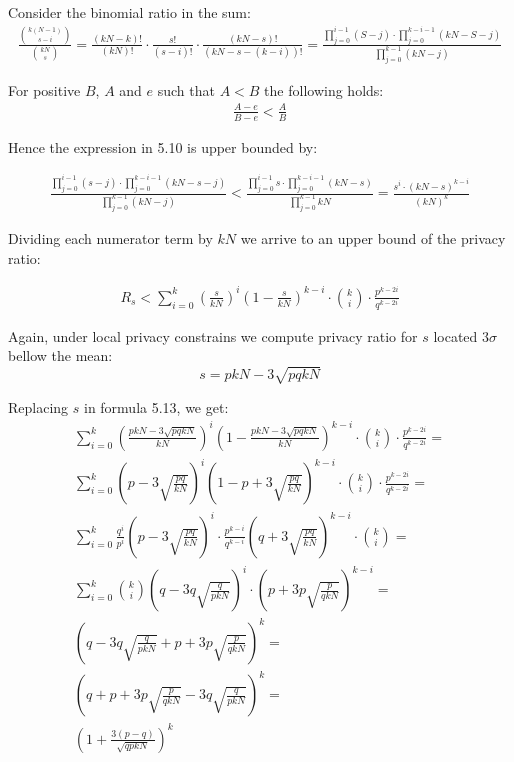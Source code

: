 \documentclass[11pt,draft]{article}
\begin{document}
Consider the binomial ratio in the sum:
\begin{align}
\frac{\binom{k(N-1)}{s - i} }{  \binom{kN}{s} } = \frac{(kN-k)!}{(kN)!}  \cdot \frac{s!}{(s-i)!}  \cdot \frac{(kN -s)!}{(kN - s - (k-i))!} = \frac{ \prod_{j=0}^{i-1} (S-j) \cdot \prod_{j=0}^{k-i-1} (kN - S-j) }{  \prod_{j=0}^{k-1} (kN -j) }
\end{align}

For positive $B$,  $A$ and $e$ such that $A < B$ the following holds:  
\begin{align}
\frac{A-e}{B-e} < \frac{A}{B}
\end{align}

Hence the expression in 5.10 is upper bounded by:

\begin{align}
\frac{ \prod_{j=0}^{i-1} (s-j) \cdot \prod_{j=0}^{k-i-1} (kN - s-j) }{  \prod_{j=0}^{k-1} (kN -j) }  < \frac{ \prod_{j=0}^{i-1} s \cdot \prod_{j=0}^{k-i-1} (kN - s)}{  \prod_{j=0}^{k-1} kN } = \frac{s^i \cdot (kN - s)^{k-i} } { (kN)^k }
\end{align}

Dividing each numerator term by $kN$ we arrive to an upper bound of the privacy ratio:

\begin{align}
R_s < \sum_{i=0}^{k}  \left ( \frac{s}{kN} \right )^i \left ( 1 - \frac{s}{kN} \right )^{k-i} \cdot \binom{k}{i}  \cdot \frac{p^{k-2i}} {q^{k-2i}}
\end{align}

Again, under local privacy constrains we compute privacy ratio for $s$ located $3 \sigma$ bellow the mean:
\[ s = pkN - 3 \sqrt{pqkN} \]

Replacing $s$ in formula 5.13, we get:
\begin{align}
\sum_{i=0}^{k}  \left ( \frac{pkN - 3 \sqrt{pqkN} }{kN} \right )^i \left ( 1 - \frac{pkN - 3 \sqrt{pqkN} }{kN} \right )^{k-i} \cdot \binom{k}{i}  \cdot \frac{p^{k-2i}} {q^{k-2i}} = \\
\sum_{i=0}^{k}  \left ( p - 3 \sqrt{\frac{pq}{kN}} \right )^i \left ( 1 - p + 3 \sqrt{\frac{pq}{kN}} \right )^{k-i} \cdot \binom{k}{i}  \cdot \frac{p^{k-2i}} {q^{k-2i}} = \\
\sum_{i=0}^{k}  \frac{q^i}{p^i} \left ( p - 3 \sqrt{\frac{pq}{kN}} \right )^i  \cdot \frac{p^{k-i}}{q^{k-i}} \left ( q + 3 \sqrt{\frac{pq}{kN}} \right )^{k-i} \cdot \binom{k}{i} = \\
\sum_{i=0}^{k}   \binom{k}{i} \left ( q - 3q \sqrt{\frac{q}{pkN}} \right )^i  \cdot  \left ( p + 3p \sqrt{\frac{p}{qkN}} \right )^{k-i} = \\
\left ( q - 3q \sqrt{\frac{q}{pkN}} + p + 3p \sqrt{\frac{p}{qkN}}  \right )^k = \\
\left ( q + p + 3p \sqrt{\frac{p}{qkN}}  - 3q \sqrt{\frac{q}{pkN}} \right )^k = \\
\left ( 1 + \frac{3(p-q)}{\sqrt{qpkN}} \right )^k
\end{align}
\end{document}
